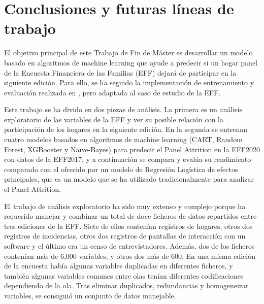 \chapter{Conclusiones y futuras líneas de trabajo}
\label{chapter:conclusiones}

El objetivo principal de este Trabajo de Fin de Máster es desarrollar un modelo basado en algoritmos de machine learning que ayude a predecir si un hogar panel de la Encuesta Financiera de las Familias (EFF) dejará de participar en la siguiente edición. Para ello, se ha seguido la implementación de entrenamiento y evaluación realizada en \cite{beste2023case}, pero adaptada al caso de estudio de la EFF.

Este trabajo se ha divido en dos piezas de análisis. La primera es un análisis exploratorio de las variables de la EFF y ver su posible relación con la participación de los hogares en la siguiente edición. En la segunda se entrenan cuatro modelos basados en algoritmos de machine learning (CART, Random Forest, XGBooster y Naïve-Bayes) para predecir el Panel Attrition en la EFF2020 con datos de la EFF2017, y a continuación se compara y evalúa su rendimiento comparado con el ofrecido por un modelo de Regresión Logística de efectos principales, que es un modelo que se ha utilizado tradicionalmente para analizar el Panel Attrition.

El trabajo de análisis exploratorio ha sido muy extenso y complejo porque ha requerido manejar y combinar un total de doce ficheros de datos repartidos entre tres ediciones de la EFF. Siete de ellos contenían registros de hogares, otros dos registros de incidencias, otros dos registros de pantallas de interacción con un software y el último era un censo de entrevistadores. Además, dos de los ficheros contenían más de 6,000 variables, y otros dos más de 600. En una misma edición de la encuesta había algunas variables duplicadas en diferentes ficheros, y también algunas variables comunes entre olas tenían diferentes codificaciones dependiendo de la ola. Tras eliminar duplicados, redundancias y homogeneizar variables, se consiguió un conjunto de datos manejable.

